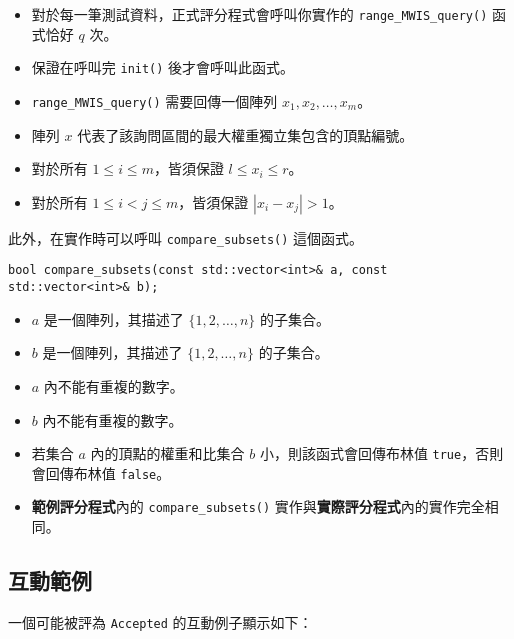 \begin{itemize}
\tightlist
\item
  對於每一筆測試資料，正式評分程式會呼叫你實作的
  \texttt{range\_MWIS\_query()} 函式恰好 \(q\) 次。
\item
  保證在呼叫完 \texttt{init()} 後才會呼叫此函式。
\item
  \texttt{range\_MWIS\_query()} 需要回傳一個陣列
  \(x_1, x_2, \ldots, x_m\)。
\item
  陣列 \(x\) 代表了該詢問區間的最大權重獨立集包含的頂點編號。
\item
  對於所有 \(1\le i \le m\)，皆須保證 \(l \leq x_i \leq r\)。
\item
  對於所有 \(1\le i < j \le m\)，皆須保證 \(|x_i - x_j| > 1\)。
\end{itemize}

此外，在實作時可以呼叫 \texttt{compare\_subsets()} 這個函式。

\begin{verbatim}
bool compare_subsets(const std::vector<int>& a, const std::vector<int>& b);
\end{verbatim}

\begin{itemize}
\tightlist
\item
  \(a\) 是一個陣列，其描述了 \(\{1, 2, \ldots, n\}\) 的子集合。
\item
  \(b\) 是一個陣列，其描述了 \(\{1, 2, \ldots, n\}\) 的子集合。
\item
  \(a\) 內不能有重複的數字。
\item
  \(b\) 內不能有重複的數字。
\item
  若集合 \(a\) 內的頂點的權重和比集合 \(b\) 小，則該函式會回傳布林值
  \texttt{true}，否則會回傳布林值 \texttt{false}。
\item
  \textbf{範例評分程式}內的 \texttt{compare\_subsets()}
  實作與\textbf{實際評分程式}內的實作完全相同。
\end{itemize}

\subsection{互動範例}

一個可能被評為 \texttt{Accepted} 的互動例子顯示如下：

